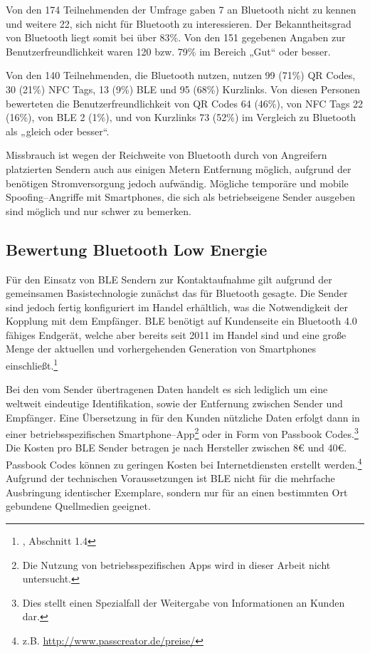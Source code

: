 Von den 174 Teilnehmenden der Umfrage gaben 7 an Bluetooth nicht zu kennen und weitere 22, sich nicht für Bluetooth zu interessieren. Der Bekanntheitsgrad von Bluetooth liegt somit bei über 83\%. Von den 151 gegebenen Angaben zur Benutzerfreundlichkeit waren 120 bzw. 79\% im Bereich „Gut“ oder besser.

Von den 140 Teilnehmenden, die Bluetooth nutzen, nutzen 99 (71\%) QR Codes, 30 (21\%) NFC Tags, 13 (9\%) \ac{BLE} und 95 (68\%) Kurzlinks. Von diesen Personen bewerteten die  Benutzerfreundlichkeit von QR Codes 64 (46\%), von NFC Tags 22 (16\%), von \ac{BLE} 2 (1\%), und von Kurzlinks 73 (52\%) im Vergleich zu Bluetooth als „gleich oder besser“.

Missbrauch ist wegen der Reichweite von Bluetooth durch von Angreifern platzierten Sendern auch aus einigen Metern Entfernung möglich, aufgrund der benötigen Stromversorgung jedoch aufwändig. Mögliche temporäre und mobile Spoofing–Angriffe mit Smartphones, die sich als betriebseigene Sender ausgeben sind möglich und nur schwer zu bemerken. 


\subsection{Bewertung Bluetooth Low Energie} %
\label{sub:bewertung_bluetooth_low_energie}
Für den Einsatz von \ac{BLE} Sendern zur Kontaktaufnahme gilt aufgrund der gemeinsamen Basistechnologie zunächst das für Bluetooth gesagte. Die Sender sind jedoch fertig konfiguriert im Handel erhältlich, was die Notwendigkeit der Kopplung mit dem Empfänger. \ac{BLE} benötigt auf Kundenseite ein Bluetooth 4.0 fähiges Endgerät, welche aber bereits seit 2011 im Handel sind und eine große Menge der aktuellen und vorhergehenden Generation von Smartphones einschließt.\footnote{\cite{gilchrist}, Abschnitt 1.4}

Bei den vom Sender übertragenen Daten handelt es sich lediglich um eine weltweit eindeutige Identifikation, sowie der Entfernung zwischen Sender und Empfänger. Eine Übersetzung in für den Kunden nützliche Daten erfolgt dann in einer betriebsspezifischen Smartphone–App\footnote{Die Nutzung von betriebsspezifischen Apps wird in dieser Arbeit nicht untersucht.} oder in Form von Passbook Codes.\footnote{Dies stellt einen Spezialfall der Weitergabe von Informationen an Kunden dar.} Die Kosten pro BLE Sender betragen je nach Hersteller zwischen 8€ und 40€. Passbook Codes können zu geringen Kosten bei Internetdiensten erstellt werden.\footnote{z.B. \url{http://www.passcreator.de/preise/}} Aufgrund der technischen Voraussetzungen ist \ac{BLE} nicht für die mehrfache Ausbringung identischer Exemplare, sondern nur für an einen bestimmten Ort gebundene Quellmedien geeignet. 

